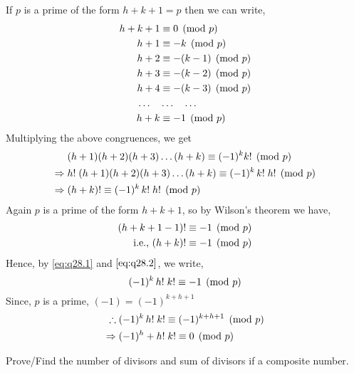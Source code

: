 \documentclass[12pt]{book}
\begin{document}
\begin{soln}
    If $ p $ is a prime of the form $ h+k+1=p $ then we can write,
    \begin{align*}
        h+k+1&\equiv 0 \pmod{p}\\
        h+1&\equiv -k \pmod{p}\\
        h+2&\equiv -(k-1) \pmod{p}\\
        h+3&\equiv -(k-2) \pmod{p}\\
        h+4&\equiv -(k-3) \pmod{p}\\
        \dots\quad&\dots\quad \dots\\
        h+k&\equiv -1 \pmod{p}
    \end{align*}
    Multiplying the above congruences, we get 
    \begin{align}
        & (h+1)(h+2)(h+3)\dots(h+k)\equiv (-1)^k k! \pmod{p}\notag\\
        \Rightarrow\;& h!\; (h+1)(h+2)(h+3)\dots(h+k)\equiv (-1)^k \,k!\; h! \pmod{p}\notag\\
        \Rightarrow\;& (h+k)! \equiv (-1)^k\, k!\; h! \pmod{p}\label{eq:q28.1}
    \end{align}
    Again $ p $ is a prime of the form $ h+k+1 $, so by Wilson's theorem we have,
    \begin{align}
        (h+k+1-1)!&\equiv -1 \pmod{p}\notag\\
        \text{i.e., }(h+k)!&\equiv -1 \pmod{p}\label{eq:q28.2}
    \end{align}
    Hence, by \eqref{eq:q28.1} and $ \eqref{eq:q28.2} $, we write,
    \[(-1)^k\, h!\;k!\equiv -1 \pmod{p}\]
    Since, $ p $ is a prime, $ (-1)=(-1)^{k+h+1} $
    \begin{align*}
        \therefore\;&(-1)^k\, h!\;k!\equiv (-1)^{k+h+1} \pmod{p}\\
        \Rightarrow\;&(-1)^h+ h!\;k!\equiv 0 \pmod{p}
    \end{align*}
\end{soln}
\begin{qn}
    Prove/Find the number of divisors and sum of divisors if a composite number.
\end{qn}
\end{document}
